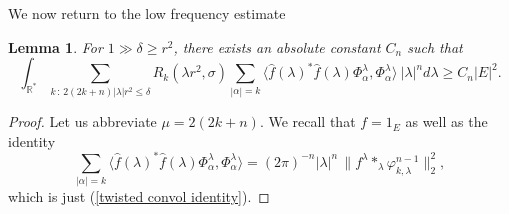 \documentclass[11pt, reqno]{amsart}
\theoremstyle{plain}
\newcommand{\R}{\ensuremath{\mathbb{R_+}}}
\newtheorem{lemma}[theorem]{Lemma}
\theoremstyle{remark}
\theoremstyle{example}
\theoremstyle{definition}
\numberwithin{equation}{section}
\def\R{\mathbb{R}}
\begin{document}
We now return to the low frequency estimate
\begin{lemma}\label{the LFE} For $1 \gg \delta \geq r^{2}$, there exists an absolute constant $C_{n}$ such that
\begin{equation}\label{low frequency contri}
    \int_{\R^{*}} \sum_{k \, : \, 2(2k +n) |\lambda | r^2 \leq \delta } R_{k}(\lambda r^{2},\sigma) \sum_{|\alpha|=k} \langle \hat{f}(\lambda)^{*} \hat{f}(\lambda) \Phi_{\alpha}^{\lambda},\Phi_{\alpha}^{\lambda} \rangle \ |\lambda|^n d\lambda \geq C_{n} |E|^2.
\end{equation}
\end{lemma}
\begin{proof}
Let us abbreviate  $\mu = 2(2k +n)$. We recall that $f= 1_{E}$ as well as the identity 
\begin{equation}\label{twisted convol identity1}
  \sum_{|\alpha|=k} \langle \widehat{f}(\lambda)^{*} \widehat{f}(\lambda) \Phi_{\alpha}^{\lambda} , \Phi_{\alpha}^{\lambda}  \rangle = (2 \pi)^{-n} |\lambda|^n \,   \| f^{\lambda} \ast_{\lambda} \varphi_{k, \lambda}^{n-1} \|_{2}^2,
\end{equation}
which is just (\ref{twisted convol identity}).


\end{proof}
\end{document}
